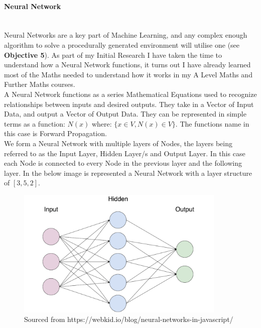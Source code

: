 \begin{flushleft}
                \paragraph{Neural Network} \mbox{} \\
                    Neural Networks are a key part of Machine Learning, and any complex enough algorithm to solve a procedurally 
                    generated environment will utilise one (see \textbf{Objective 5}). As part of my Initial Research I have taken the time to understand 
                    how a Neural Network functions, it turns out I have already learned most of the Maths needed to understand 
                    how it works in my A Level Maths and Further Maths courses. \\
                    \vspace{0.2cm}
                    A Neural Network functions as a series Mathematical Equations used to recognize relationships between inputs
                    and desired outputs. They take in a Vector of Input Data, and output a Vector of Output Data. They can be represented
                    in simple terms as a function: $N(x)$ where: $\{x \in V, N(x) \in V\}$.
                    The functions name in this case is Forward Propagation. \\
                    \vspace{0.2cm}
                    We form a Neural Network with multiple layers of Nodes, the layers being referred to as the Input Layer, 
                    Hidden Layer/s and Output Layer. In this case each Node is connected to every Node in the previous layer and
                    the following layer. In the below image is represented a Neural Network with a layer structure of $[3, 5, 2]$.

                    \begin{figure}[H]
                        \centerline{\includegraphics[width=10cm]{Images/InitialResearch/NeuralNetworkExample.png}}
                        \caption*{Sourced from https://webkid.io/blog/neural-networks-in-javascript/}
                    \end{figure}
                    


\end{flushleft}
